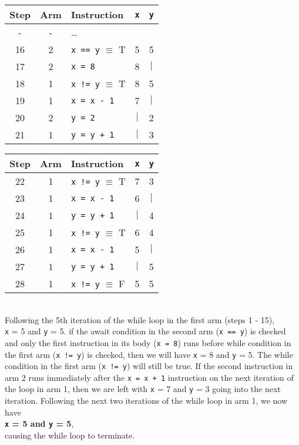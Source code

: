 \documentclass[11pt]{article}
\newcommand{\code}[1]{\texttt{#1}}
\begin{document}
\begin{enumerate}
\begin{enumerate}
	\begin{tabular}{c |c | l | c | c }
		Step & Arm & Instruction	&	\code{x}	&  \code{y}	\\
		\hline
		- 	& - & \ldots & & \\
		16 	& 2 & \code{x == y} $\equiv$ T	&	5	&	5\\
		17 	& 2 & \code{x = 8}				&	8	&	$|$\\
		18 	& 1 & \code{x != y} $\equiv$ T	&	8	&	5\\
		19 	& 1 & \code{x = x - 1}			&	7	&	$|$\\
		20 	& 2 & \code{y = 2}				&	$|$	&	2\\
		21 	& 1 & \code{y = y + 1}			&	$|$	&	3\\
		\end{tabular}\hspace{0.8cm}
	\begin{tabular}{c |c | l | c | c }
		Step & Arm & Instruction	&	\code{x}	&  \code{y}	\\
		\hline
		22 	& 1 & \code{x != y} $\equiv$ T	&	7	&	3\\
		23 	& 1 & \code{x = x - 1}			&	6	&	$|$\\
		24 	& 1 & \code{y = y + 1}			&	$|$	&	4\\
		25 	& 1 & \code{x != y} $\equiv$ T	&	6	&	4\\
		26 	& 1 & \code{x = x - 1}			&	5	&	$|$\\
		27 	& 1 & \code{y = y + 1}			&	$|$	&	5\\
		28 	& 1 & \code{x != y} $\equiv$ F	&	5	&	5\\
		
	\end{tabular}\\
	
	\hspace{0.8cm}Following the 5th iteration of the while loop in the first arm (steps 1 - 15),\\
	\code{x} = 5 and \code{y} = 5. if the await condition in the second arm (\code{x == y}) is checked and only the first instruction in its body (\code{x = 8}) runs before while condition in the first arm (\code{x != y}) is checked, then we will have \code{x} = 8 and \code{y} = 5. The while condition in the first arm (\code{x != y}) will still be true. If the second instruction in arm 2 runs immediately after the \code{x = x + 1} instruction on the next iteration of the loop in arm 1, then  we are left with \code{x} = 7 and \code{y} = 3 going into the next iteration. Following the next two iterations of the while loop in arm 1, we now have \\ 
	\textbf{\code{x} = 5 and \code{y} = 5}, \\
	causing the while loop to terminate.\\
	

\end{enumerate}
\end{enumerate}
\end{document}

